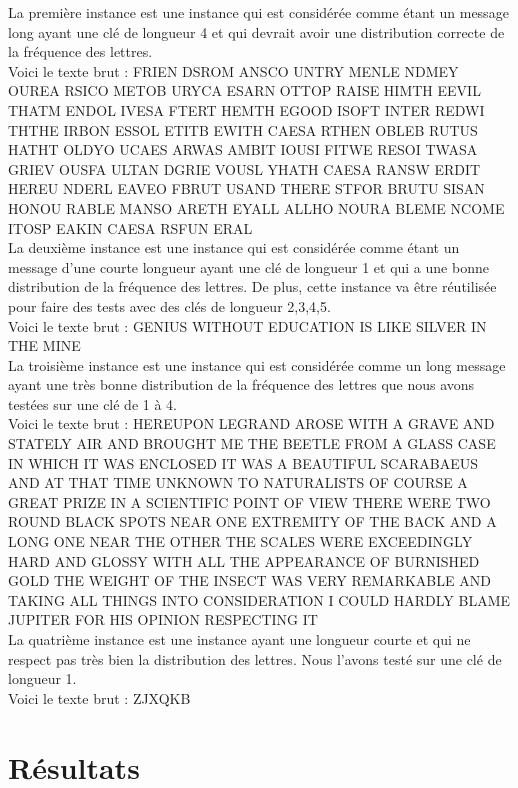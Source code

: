 \documentclass[11pt]{article}
\begin{document}
		La première instance est une instance qui est considérée comme étant un message
		long ayant une clé de longueur 4 et qui devrait avoir une distribution correcte de la fréquence des lettres. \\
		Voici le texte brut : {\tiny FRIEN DSROM ANSCO UNTRY MENLE NDMEY OUREA RSICO METOB URYCA ESARN OTTOP RAISE HIMTH EEVIL THATM ENDOL IVESA FTERT HEMTH EGOOD ISOFT INTER REDWI THTHE IRBON ESSOL ETITB EWITH CAESA RTHEN OBLEB RUTUS HATHT OLDYO UCAES ARWAS AMBIT IOUSI FITWE RESOI TWASA GRIEV OUSFA ULTAN DGRIE VOUSL YHATH CAESA RANSW ERDIT HEREU NDERL EAVEO FBRUT USAND THERE STFOR BRUTU SISAN HONOU RABLE MANSO ARETH EYALL ALLHO NOURA BLEME NCOME ITOSP EAKIN CAESA RSFUN ERAL} \\

		La deuxième instance est une instance qui est considérée comme étant un message
		d'une courte longueur ayant une clé de longueur 1 et qui a une bonne distribution de la fréquence des lettres.
		De plus, cette instance va être réutilisée pour faire des tests avec des clés de longueur 2,3,4,5.
		\\ Voici le texte brut : {\tiny GENIUS WITHOUT EDUCATION IS LIKE SILVER IN THE MINE} \\

		La troisième instance est une instance qui est considérée comme un long message ayant une
		très bonne distribution de la fréquence des lettres que nous avons testées sur une clé de 1 à 4.
		\\ Voici le texte brut : {\tiny HEREUPON LEGRAND AROSE WITH A GRAVE AND STATELY AIR AND BROUGHT ME THE BEETLE FROM A GLASS CASE IN WHICH IT WAS ENCLOSED IT WAS A BEAUTIFUL SCARABAEUS AND AT THAT TIME UNKNOWN TO NATURALISTS OF COURSE A GREAT PRIZE IN A SCIENTIFIC POINT OF VIEW THERE WERE TWO ROUND BLACK SPOTS NEAR ONE EXTREMITY OF THE BACK AND A LONG ONE NEAR THE OTHER THE SCALES WERE EXCEEDINGLY HARD AND GLOSSY WITH ALL THE APPEARANCE OF BURNISHED GOLD THE WEIGHT OF THE INSECT WAS VERY REMARKABLE AND TAKING ALL THINGS INTO CONSIDERATION I COULD HARDLY BLAME JUPITER FOR HIS OPINION RESPECTING IT}\\

		La quatrième instance est une instance ayant une longueur courte et qui
		ne respect pas très bien la distribution des lettres. Nous l'avons testé
		sur une clé de longueur 1. \\ Voici le texte brut : {\tiny ZJXQKB} \\

	\newpage
    \section{Résultats}
\end{document}
